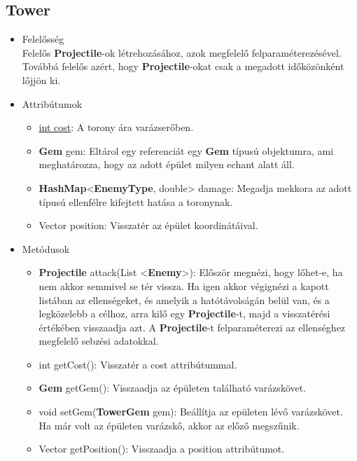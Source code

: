 \subsection{Tower}
\begin{itemize}
\item Felelősség\\
Felelős \textbf{Projectile}-ok létrehozásához, azok megfelelő felparaméterezésével. Továbbá felelős azért, hogy \textbf{Projectile}-okat csak a megadott időközönként lőjjön ki.
\item Attribútumok
	\begin{itemize}
		\item \underline{int cost}: A torony ára varázserőben.
		\item \textbf{Gem} gem: Eltárol egy referenciát egy \textbf{Gem} típusú objektumra, ami meghatározza, hogy az adott épület milyen echant alatt áll.
		\item \textbf{HashMap}<\textbf{EnemyType}, double> damage: Megadja mekkora az adott típusú ellenfélre kifejtett hatása a toronynak.
		\item Vector position: Visszatér az épület koordinátáival.
	\end{itemize}
\item Metódusok
	\begin{itemize}
		\item \textbf{Projectile} attack(List <\textbf{Enemy}>): Először megnézi, hogy lőhet-e, ha nem akkor semmivel se tér vissza. Ha igen akkor végignézi a kapott listában az ellenségeket, és amelyik a hatótávolságán belül van, és a legközelebb a célhoz, arra kilő egy \textbf{Projectile}-t, majd a visszatérési értékében visszaadja azt. A \textbf{Projectile}-t felparaméterezi az ellenséghez megfelelő sebzési adatokkal.
		\item int getCost(): Visszatér a cost attribútummal.
		\item \textbf{Gem} getGem(): Visszaadja az épületen található varázskövet.
		\item void setGem(\textbf{TowerGem} gem): Beállítja az epületen lévő varázskövet. Ha már volt az épületen varázskő, akkor az előző megszűnik.
		\item Vector getPosition(): Visszaadja a position attribútumot.
	\end{itemize}
\end{itemize}


